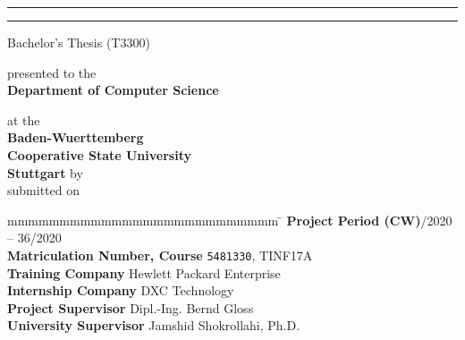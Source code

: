 \hfill
{}

\vfill\vfill

\begin{center}
	\rule{\linewidth}{1pt}
	{
		\Huge \bfseries
			\@title
		\par	
	}
	\vspace{-0.2cm}
	\rule{\linewidth}{1pt}
	

	Bachelor's Thesis (T3300)
	\vfill
	
	presented to the \\ \textbf{Department of Computer Science}
	
	at the \\ \textbf{Baden-Wuerttemberg \\Cooperative State University\\Stuttgart}
	\vfill
	by \\ \textbf{\textsc{\@author}}
	\vfill \vfill
	submitted on \\ \textbf{\@date}
\end{center}

\vfill\vfill

\begin{tabbing}
	mmmmmmmmmmmmmmmmmmmmmmmmmm				\= \kill
	\textbf{Project Period (CW)}/2020 -- 36/2020 \\
	\textbf{Matriculation Number, Course} \> \texttt{5481330}, TINF17A \\
	\textbf{Training Company} \> Hewlett Packard Enterprise \\
	\textbf{Internship Company} \> DXC Technology \\
	\textbf{Project Supervisor} \> Dipl.-Ing. Bernd Gloss \\
	\textbf{University Supervisor} \> Jamshid Shokrollahi, Ph.D.
\end{tabbing}
